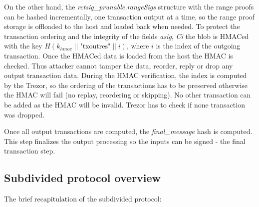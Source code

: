 \documentclass[]{article}
\begin{document}
On the other hand, the \emph{rctsig\_prunable.rangeSigs} structure with the range proofs can be hashed incrementally, one transaction output at a time, so the range proof storage is offloaded to the host and loaded back when needed. To protect the transaction ordering and the integrity of the fields \emph{asig}, \emph{Ci} the blob is HMACed with the key $H(k_{hmac} \; || \; \text{"txoutres"} \; || \; i)$, where $i$ is the index of the outgoing transaction. Once the HMACed data is loaded from the host the HMAC is checked. Thus attacker cannot tamper the data, reorder, reply or drop any output transaction data. During the HMAC verification, the index is computed by the Trezor, so the ordering of the transactions has to be preserved otherwise the HMAC will fail (no replay, reordering or skipping). No other transaction can be added as the HMAC will be invalid. Trezor has to check if none transaction was dropped.

Once all output transactions are computed, the \emph{final\_message} hash is computed. This step finalizes the output processing so the inputs can be signed - the final transaction step.

\subsection{Subdivided protocol overview}

The brief recapitulation of the subdivided protocol:
\end{document}
